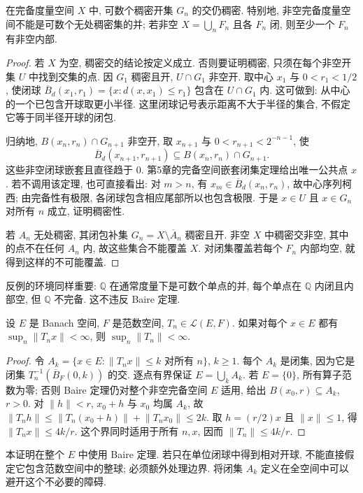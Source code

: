 \begin{theorem}[Baire 定理]\label{thm:baire}
在完备度量空间 $X$ 中, 可数个稠密开集 $G_n$ 的交仍稠密. 特别地, 非空完备度量空间不能是可数个无处稠密集的并; 若非空 $X=\bigcup_n F_n$ 且各 $F_n$ 闭, 则至少一个 $F_n$ 有非空内部.
\end{theorem}
\begin{proof}
若 $X$ 为空, 稠密交的结论按定义成立. 否则要证明稠密, 只须在每个非空开集 $U$ 中找到交集的点. 因 $G_1$ 稠密且开, $U\cap G_1$ 非空开. 取中心 $x_1$ 与 $0<r_1<1/2$, 使闭球 $\overline B_d(x_1,r_1)=\{x:d(x,x_1)\le r_1\}$ 包含在 $U\cap G_1$ 内. 这可做到: 从中心的一个已包含开球取更小半径. 这里闭球记号表示距离不大于半径的集合, 不假定它等于同半径开球的闭包.

归纳地, $B(x_n,r_n)\cap G_{n+1}$ 非空开, 取 $x_{n+1}$ 与 $0<r_{n+1}<2^{-n-1}$, 使
\[
 \overline B_d(x_{n+1},r_{n+1})\subseteq B(x_n,r_n)\cap G_{n+1}.
\]
这些非空闭球嵌套且直径趋于 $0$. 第5章的完备空间嵌套闭集定理给出唯一公共点 $x$. 若不调用该定理, 也可直接看出: 对 $m>n$, 有 $x_m\in\overline B_d(x_n,r_n)$, 故中心序列柯西; 由完备性有极限, 各闭球包含相应尾部所以也包含极限. 于是 $x\in U$ 且 $x\in G_n$ 对所有 $n$ 成立, 证明稠密性.

若 $A_n$ 无处稠密, 其闭包补集 $G_n=X\setminus\overline A_n$ 稠密且开. 非空 $X$ 中稠密交非空, 其中的点不在任何 $A_n$ 内, 故这些集合不能覆盖 $X$. 对闭集覆盖若每个 $F_n$ 内部均空, 就得到这样的不可能覆盖.
\end{proof}
反例的环境同样重要: $\mathbb Q$ 在通常度量下是可数个单点的并, 每个单点在 $\mathbb Q$ 内闭且内部空, 但 $\mathbb Q$ 不完备. 这不违反 Baire 定理.

\begin{theorem}[一致有界原理]\label{thm:uniform-boundedness}
设 $E$ 是 Banach 空间, $F$ 是范数空间, $T_n\in\mathcal L(E,F)$. 如果对每个 $x\in E$ 都有 $\sup_n\lVert T_nx\rVert<\infty$, 则 $\sup_n\lVert T_n\rVert<\infty$.
\end{theorem}
\begin{proof}
令 $A_k=\{x\in E:\lVert T_nx\rVert\le k\text{ 对所有 }n\}$, $k\ge1$. 每个 $A_k$ 是闭集, 因为它是闭集 $T_n^{-1}(\overline B_F(0,k))$ 的交. 逐点有界保证 $E=\bigcup_k A_k$. 若 $E=\{0\}$, 所有算子范数为零; 否则 Baire 定理仍对整个非空完备空间 $E$ 适用, 给出 $B(x_0,r)\subseteq A_k$, $r>0$. 对 $\lVert h\rVert<r$, $x_0+h$ 与 $x_0$ 均属 $A_k$, 故
$\lVert T_nh\rVert\le\lVert T_n(x_0+h)\rVert+\lVert T_nx_0\rVert\le2k$.
取 $h=(r/2)x$ 且 $\lVert x\rVert\le1$, 得 $\lVert T_nx\rVert\le4k/r$. 这个界同时适用于所有 $n,x$, 因而 $\lVert T_n\rVert\le4k/r$.
\end{proof}
本证明在整个 $E$ 中使用 Baire 定理. 若只在单位闭球中得到相对开球, 不能直接假定它包含范数空间中的整球; 必须额外处理边界. 将闭集 $A_k$ 定义在全空间中可以避开这个不必要的障碍.

